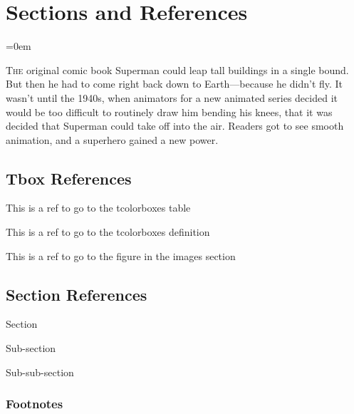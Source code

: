 \section{Sections and References}
\label{sec:sections_and_references}
\parindent=0em

\lettrine[lines=3, findent=3pt, nindent=0pt]{T}{he} original comic book Superman
could leap tall buildings in a single bound. But then he had to come right back
down to Earth—because he didn't fly. It wasn't until the 1940s, when animators
for a new animated series decided it would be too difficult to routinely draw
him bending his knees, that it was decided that Superman could take off into the
air. Readers got to see smooth animation, and a superhero gained a new power.
\vspace{0.5cm}

\subsection{Tbox References}
\label{ssec:tbox_references}

This is a ref to go to the tcolorboxes table 

This is a ref to go to the tcolorboxes definition 

This is a ref to go to the figure in the images section 

\subsectionend

\vspace{0.5cm}

\subsection{Section References}
\label{ssec:section_references}

Section 

Sub-section 

Sub-sub-section 


\subsectionend

\vspace{0.5cm}

\subsubsection{Footnotes}
\label{sssec:footnotes}

